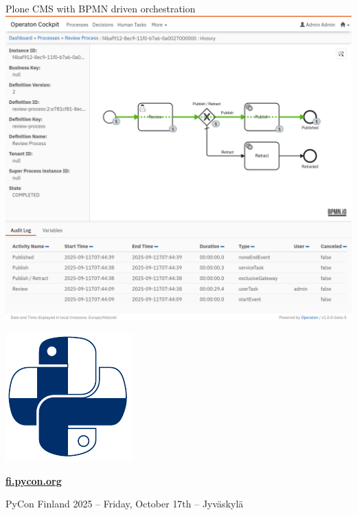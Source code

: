 \documentclass[12pt,aspectratio=169]{beamer}
\begin{document}

\begin{frame}{Plone CMS with BPMN driven orchestration}
  \includegraphics[width=0.95\columnwidth]{images/history.png}
\end{frame}


\begin{frame}
\vfill
\huge
\centering \includegraphics[height=0.50\paperheight]{images/PyCon-Finland.pdf}
\par
\textbf{\href{https://pyconfi.ploneconf.org}{fi.pycon.org}}
\par
\normalsize
\vfill
PyCon Finland 2025 – Friday, October 17th – Jyväskylä \\
\vfill
\end{frame}
\end{document}
